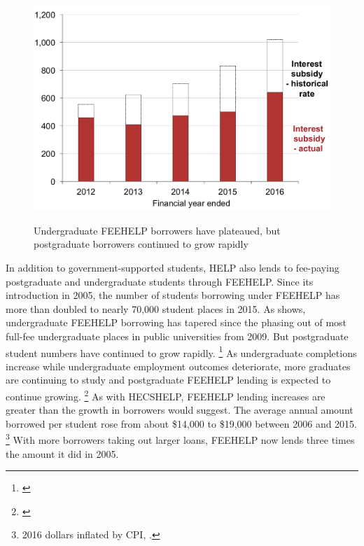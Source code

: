\documentclass[embargoed]{grattan}
\begin{document}
\begin{figure}
\caption[Undergraduate FEE-HELP borrowers have plateaued, but postgraduate borrowers continued to grow rapidly]{Undergraduate \gls{FEEHELP} borrowers have plateaued, but postgraduate borrowers continued to grow rapidly}\label{fig:fig5-undergrad-HELP-borrowers-have-plateaued-but-postgrad-borrowers-continued-to-grow-rapidly}

\includegraphics[page=5]{atlas/Chartpack.pdf}
%
{\textcites{EducationvariousyearsSelectedhighereducation}{EducationvariousyearsHighereducationreport}}
\end{figure}

In addition to government-supported students, \gls{HELP} also lends to fee-paying postgraduate and undergraduate students through \gls{FEEHELP}.
Since its introduction in 2005, the number of students borrowing under \gls{FEEHELP} has more than doubled to nearly 70,000 student places in 2015.
As  shows, undergraduate \gls{FEEHELP} borrowing has tapered since the phasing out of most full-fee undergraduate places in public universities from 2009.
But postgraduate student numbers have continued to grow rapidly.%
\footnote{\textcites[][Section 5, Table 5.1]{Education2015StudentsSelectedhigher}{Education2015Highereducationreport}} As undergraduate completions increase while undergraduate employment outcomes deteriorate, more graduates are continuing to study and postgraduate \gls{FEEHELP} lending is expected to continue growing.%
\footnote{\textcites{Norton2016MappingAustralianhigher}{Education2016uCubeHighereducation}}
As with \gls{HECSHELP}, \gls{FEEHELP} lending increases are greater than the growth in borrowers would suggest.
The average annual amount borrowed per student rose from about \$14,000 to \$19,000 between 2006 and 2015.%
\footnote{2016 dollars inflated by \gls{CPI}, \textcite{ABS2016ConsumerPriceIndex}.} With more borrowers taking out larger loans, \gls{FEEHELP} now lends three times the amount it did in 2005.
\end{document}
